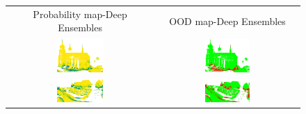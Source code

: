     \begin{figure}[h!]
        \centering
        \begin{tabular}{cc}
            Probability map-Deep Ensembles & OOD map-Deep Ensembles \\
            \includegraphics[width=0.33\textwidth, height=0.18\textheight]{images/ood_imgs/de_sem3d/de_prob_10_1.pdf}& 
            \includegraphics[width=0.33\textwidth, height=0.18\textheight]{images/ood_imgs/de_sem3d/de_ood_auroc_1.pdf}\\

            \includegraphics[width=0.33\textwidth, height=0.18\textheight]{images/ood_imgs/de_sem3d/de_prob_10_2.pdf}& 
            \includegraphics[width=0.33\textwidth, height=0.18\textheight]{images/ood_imgs/de_sem3d/de_ood_auroc_2.pdf}\\


\end{tabular}
\end{figure}
